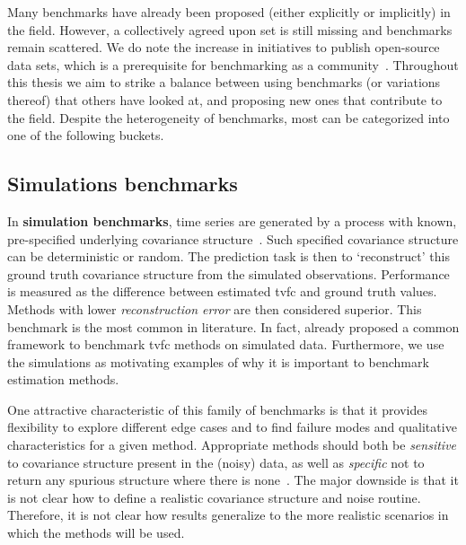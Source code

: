 Many benchmarks have already been proposed (either explicitly or implicitly) in the field.
However, a collectively agreed upon set is still missing and benchmarks remain scattered.
We do note the increase in initiatives to publish open-source data sets, which is a prerequisite for benchmarking as a community~\parencite{Gorgolewski2016, Kennedy2016, Nichols2017, Leenings2022}.
Throughout this thesis we aim to strike a balance between using benchmarks (or variations thereof) that others have looked at, and proposing new ones that contribute to the field.
Despite the heterogeneity of benchmarks, most can be categorized into one of the following buckets.

\subsection{Simulations benchmarks}\label{subsec:simulation-benchmarks}

In \textbf{simulation benchmarks}, time series are generated by a process with known, pre-specified underlying covariance structure~\parencite[see e.g.][]{Sakoglu2010, Lindquist2014, Hindriks2016, Shakil2016, Lan2017, Monti2017, Taghia2017, Thompson2018, Warnick2018, Li2019b, Ebrahimi2020}.
Such specified covariance structure can be deterministic or random.
%
The prediction task is then to `reconstruct' this ground truth covariance structure from the simulated observations.
Performance is measured as the difference between estimated \gls{tvfc} and ground truth values.
Methods with lower \emph{reconstruction error} are then considered superior.
%
This benchmark is the most common in literature.
In fact, \textcite{Thompson2018} already proposed a common framework to benchmark \gls{tvfc} methods on simulated data.
%
Furthermore, we use the simulations as motivating examples of why it is important to benchmark estimation methods.

One attractive characteristic of this family of benchmarks is that it provides flexibility to explore different edge cases and to find failure modes and qualitative characteristics for a given method.
Appropriate methods should both be \emph{sensitive} to covariance structure present in the (noisy) data, as well as \emph{specific} not to return any spurious structure where there is none~\parencite{Leonardi2015}.
%
The major downside is that it is not clear how to define a realistic covariance structure and noise routine.
Therefore, it is not clear how results generalize to the more realistic scenarios in which the methods will be used.

